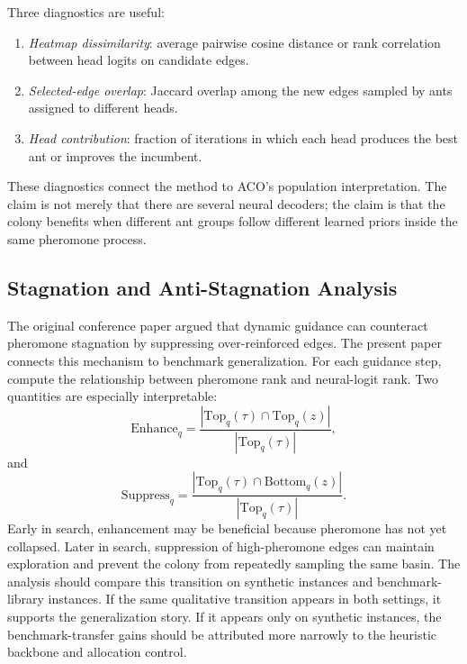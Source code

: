\documentclass[11pt]{article}
\begin{document}
Three diagnostics are useful:
\begin{enumerate}
    \item \emph{Heatmap dissimilarity}: average pairwise cosine distance or rank correlation between head logits on candidate edges.
    \item \emph{Selected-edge overlap}: Jaccard overlap among the new edges sampled by ants assigned to different heads.
    \item \emph{Head contribution}: fraction of iterations in which each head produces the best ant or improves the incumbent.
\end{enumerate}
These diagnostics connect the method to ACO's population interpretation.
The claim is not merely that there are several neural decoders; the claim is that the colony benefits when different ant groups follow different learned priors inside the same pheromone process.

\subsection{Stagnation and Anti-Stagnation Analysis}
\label{sec:stagnation-analysis}

The original conference paper argued that dynamic guidance can counteract pheromone stagnation by suppressing over-reinforced edges.
The present paper connects this mechanism to benchmark generalization.
For each guidance step, compute the relationship between pheromone rank and neural-logit rank.
Two quantities are especially interpretable:
\begin{equation}
\mathrm{Enhance}_q
=
\frac{
|\mathrm{Top}_q(\tau)\cap \mathrm{Top}_q(z)|
}{
|\mathrm{Top}_q(\tau)|
},
\end{equation}
and
\begin{equation}
\mathrm{Suppress}_q
=
\frac{
|\mathrm{Top}_q(\tau)\cap \mathrm{Bottom}_q(z)|
}{
|\mathrm{Top}_q(\tau)|
}.
\end{equation}
Early in search, enhancement may be beneficial because pheromone has not yet collapsed.
Later in search, suppression of high-pheromone edges can maintain exploration and prevent the colony from repeatedly sampling the same basin.
The analysis should compare this transition on synthetic instances and benchmark-library instances.
If the same qualitative transition appears in both settings, it supports the generalization story.
If it appears only on synthetic instances, the benchmark-transfer gains should be attributed more narrowly to the heuristic backbone and allocation control.
\end{document}
